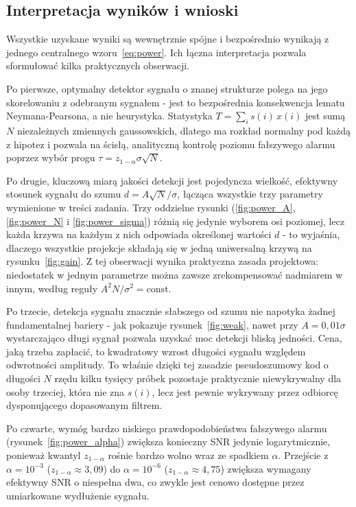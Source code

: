 \documentclass[12pt,a4paper]{article}
\begin{document}
\subsection{Interpretacja wyników i wnioski}

Wszystkie uzyskane wyniki są wewnętrznie spójne i bezpośrednio wynikają z jednego centralnego wzoru~\eqref{eq:power}. Ich łączna interpretacja pozwala sformułować kilka praktycznych obserwacji.

Po pierwsze, optymalny detektor sygnału o znanej strukturze polega na jego skorelowaniu z odebranym sygnałem - jest to bezpośrednia konsekwencja lematu Neymana-Pearsona, a nie heurystyka. Statystyka $T = \sum_i s(i)\,x(i)$ jest sumą $N$ niezależnych zmiennych gaussowskich, dlatego ma rozkład normalny pod każdą z hipotez i pozwala na ścisłą, analityczną kontrolę poziomu fałszywego alarmu poprzez wybór progu $\tau = z_{1-\alpha}\sigma\sqrt{N}$.

Po drugie, kluczową miarą jakości detekcji jest pojedyncza wielkość, efektywny stosunek sygnału do szumu $d = A\sqrt{N}/\sigma$, łącząca wszystkie trzy parametry wymienione w treści zadania. Trzy oddzielne rysunki (\ref{fig:power_A}, \ref{fig:power_N} i \ref{fig:power_sigma}) różnią się jedynie wyborem osi poziomej, lecz każda krzywa na każdym z nich odpowiada określonej wartości $d$ - to wyjaśnia, dlaczego wszystkie projekcje składają się w jedną uniwersalną krzywą na rysunku~\ref{fig:gain}. Z tej obserwacji wynika praktyczna zasada projektowa: niedostatek w jednym parametrze można zawsze zrekompensować nadmiarem w innym, według reguły $A^2 N / \sigma^2 = \mathrm{const}$.

Po trzecie, detekcja sygnału znacznie słabszego od szumu nie napotyka żadnej fundamentalnej bariery - jak pokazuje rysunek~\ref{fig:weak}, nawet przy $A = 0{,}01\sigma$ wystarczająco długi sygnał pozwala uzyskać moc detekcji bliską jedności. Cena, jaką trzeba zapłacić, to kwadratowy wzrost długości sygnału względem odwrotności amplitudy. To właśnie dzięki tej zasadzie pseudoszumowy kod o długości $N$ rzędu kilku tysięcy próbek pozostaje praktycznie niewykrywalny dla osoby trzeciej, która nie zna $s(i)$, lecz jest pewnie wykrywany przez odbiorcę dysponującego dopasowanym filtrem.

Po czwarte, wymóg bardzo niskiego prawdopodobieństwa fałszywego alarmu (rysunek~\ref{fig:power_alpha}) zwiększa konieczny SNR jedynie logarytmicznie, ponieważ kwantyl $z_{1-\alpha}$ rośnie bardzo wolno wraz ze spadkiem $\alpha$. Przejście z $\alpha = 10^{-3}$ ($z_{1-\alpha} \approx 3{,}09$) do $\alpha = 10^{-6}$ ($z_{1-\alpha} \approx 4{,}75$) zwiększa wymagany efektywny SNR o niespełna dwa, co zwykle jest cenowo dostępne przez umiarkowane wydłużenie sygnału.
\end{document}
